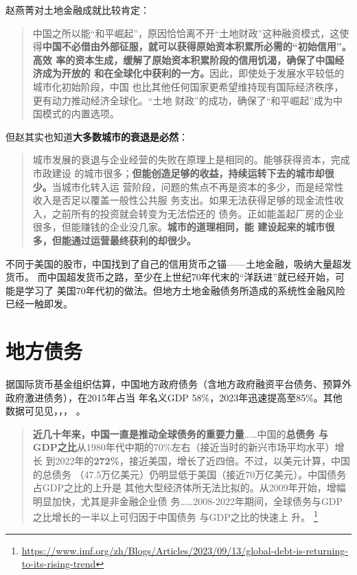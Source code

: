 赵燕菁对土地金融成就比较肯定：
\begin{quotation}
  中国之所以能“和平崛起”，原因恰恰离不开“土地财政”这种融资模式，这使
  得\textbf{中国不必借由外部征服，就可以获得原始资本积累所必需的“初始信用”。高效
    率的资本生成，缓解了原始资本积累阶段的信用饥渴，确保了中国经济成为开放的
    和在全球化中获利的一方。}因此，即使处于发展水平较低的城市化初始阶段，中国
  也比其他任何国家更希望维持现有国际经济秩序，更有动力推动经济全球化。“土地
  财政”的成功，确保了“和平崛起”成为中国模式的内置选项。
\end{quotation}

但赵其实也知道\textbf{大多数城市的衰退是必然}：
\begin{quotation}
  城市发展的衰退与企业经营的失败在原理上是相同的。能够获得资本，完成市政建设
  的城市很多；\textbf{但能创造足够的收益，持续运转下去的城市却很少。}当城市化转入运
  营阶段，问题的焦点不再是资本的多少，而是经常性收入是否足以覆盖一般性公共服
  务支出。如果无法获得足够的现金流性收入，之前所有的投资就会转变为无法偿还的
  债务。正如能盖起厂房的企业很多，但能赚钱的企业没几家。\textbf{城市的道理相同，能
    建设起来的城市很多，但能通过运营最终获利的却很少。}
\end{quotation}

不同于美国的股市，中国找到了自己的信用货币之锚——土地金融，吸纳大量超发货币。
而中国超发货币之路，至少在上世纪70年代末的“洋跃进”就已经开始，可能是学习了
美国70年代初的做法。但地方土地金融债务所造成的系统性金融风险已经一触即发。



\section{地方债务}




据国际货币基金组织估算，中国地方政府债务（含地方政府融资平台债务、预算外政府激进债务），在2015年占当
年名义GDP 58\%，2023年迅速提高至85\%。其他数据可见见，，，
。

\begin{quotation}
  \textbf{近几十年来，中国一直是推动全球债务的重要力量}……中国的\textbf{总债务
    与GDP之比}从1980年代中期的70\%左右（接近当时的新兴市场平均水平）增长
  到2022年的\textbf{272\%}，接近美国，增长了近四倍。不过，以美元计算，中国的总债务
  （47.5万亿美元）仍明显低于美国（接近70万亿美元）。中国债务占GDP之比的上升是
  其他大型经济体所无法比拟的。从2009年开始，增幅明显加快，尤其是非金融企业债
  务……2008-2022年期间，全球债务与GDP之比增长的一半以上可归因于中国债务
  与GDP之比的快速上
  升。
  \footnote{\url{https://www.imf.org/zh/Blogs/Articles/2023/09/13/global-debt-is-returning-to-its-rising-trend}}
\end{quotation}

